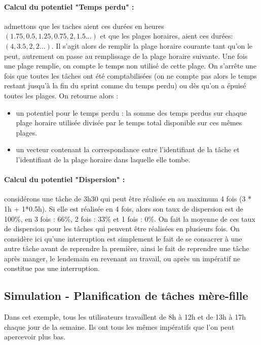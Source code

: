 \documentclass[12pt]{article}
\begin{document}
\paragraph{Calcul du potentiel "Temps perdu" :} admettons que les taches aient ces durées en heures $(1.75,0.5,1.25,0.75,2,1.5...)$ et que les plages horaires, aient ces durées: $(4,3.5,2,2...)$. Il s'agit alors de remplir la plage horaire courante tant qu'on le peut, autrement on passe au remplissage de la plage horaire suivante. Une fois une plage remplie, on compte le temps non utilisé de cette plage. On s'arrête une fois que toutes les tâches ont été comptabilisées (on ne compte pas alors le temps restant jusqu'à la fin du sprint comme du temps perdu) ou dès qu'on a épuisé toutes les plages. On retourne alors :
\begin{itemize}
\item un potentiel pour le temps perdu : la somme des temps perdus sur chaque plage horaire utilisée divisée par le temps total disponible sur ces mêmes plages. 
\item un vecteur contenant la correspondance entre l'identifiant de la tâche et l'identifiant de la plage horaire dans laquelle elle tombe.
\end{itemize}


\paragraph{Calcul du potentiel "Dispersion" :} considérons une tâche de 3h30 qui peut être réalisée en au maximum 4 fois (3 * 1h + 1*0.5h). Si elle est réalisée en 4 fois, alors son taux de dispersion est de 100\%, en 3 fois : 66\%, 2 fois : 33\% et 1 fois : 0\%. On fait la moyenne de ces taux de dispersion pour les tâches qui peuvent être réalisées en plusieurs fois. On considère ici qu'une interruption est simplement le fait de se consacrer à une autre tâche avant de reprendre la première, ainsi le fait de reprendre une tâche après manger, le lendemain en revenant au travail, ou après un impératif ne constitue pas une interruption.
 





\newpage
\subsection{Simulation - Planification de tâches mère-fille}

Dans cet exemple, tous les utilisateurs travaillent de 8h à 12h et de 13h à 17h chaque jour de la semaine. Ils ont tous les mêmes impératifs que l'on peut apercevoir plus bas.
\end{document}
